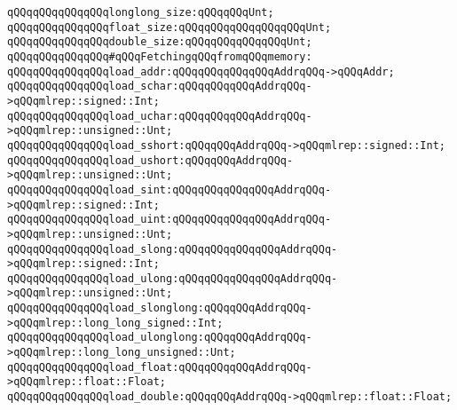 \verb|qQQqqQQqqQQqqQQqlonglong_size:qQQqqQQqUnt;|\newline
\verb|qQQqqQQqqQQqqQQqfloat_size:qQQqqQQqqQQqqQQqqQQqUnt;|\newline
\verb|qQQqqQQqqQQqqQQqdouble_size:qQQqqQQqqQQqqQQqUnt;|\newline
\newline
\newline
\newline
\verb|qQQqqQQqqQQqqQQq#qQQqFetchingqQQqfromqQQqmemory:|\newline
\newline
\verb|qQQqqQQqqQQqqQQqload_addr:qQQqqQQqqQQqqQQqAddrqQQq->qQQqAddr;|\newline
\newline
\verb|qQQqqQQqqQQqqQQqload_schar:qQQqqQQqqQQqAddrqQQq->qQQqmlrep::signed::Int;|\newline
\verb|qQQqqQQqqQQqqQQqload_uchar:qQQqqQQqqQQqAddrqQQq->qQQqmlrep::unsigned::Unt;|\newline
\newline
\verb|qQQqqQQqqQQqqQQqload_sshort:qQQqqQQqAddrqQQq->qQQqmlrep::signed::Int;|\newline
\verb|qQQqqQQqqQQqqQQqload_ushort:qQQqqQQqAddrqQQq->qQQqmlrep::unsigned::Unt;|\newline
\newline
\verb|qQQqqQQqqQQqqQQqload_sint:qQQqqQQqqQQqqQQqAddrqQQq->qQQqmlrep::signed::Int;|\newline
\verb|qQQqqQQqqQQqqQQqload_uint:qQQqqQQqqQQqqQQqAddrqQQq->qQQqmlrep::unsigned::Unt;|\newline
\newline
\verb|qQQqqQQqqQQqqQQqload_slong:qQQqqQQqqQQqqQQqAddrqQQq->qQQqmlrep::signed::Int;|\newline
\verb|qQQqqQQqqQQqqQQqload_ulong:qQQqqQQqqQQqqQQqAddrqQQq->qQQqmlrep::unsigned::Unt;|\newline
\newline
\verb|qQQqqQQqqQQqqQQqload_slonglong:qQQqqQQqAddrqQQq->qQQqmlrep::long_long_signed::Int;|\newline
\verb|qQQqqQQqqQQqqQQqload_ulonglong:qQQqqQQqAddrqQQq->qQQqmlrep::long_long_unsigned::Unt;|\newline
\newline
\verb|qQQqqQQqqQQqqQQqload_float:qQQqqQQqqQQqAddrqQQq->qQQqmlrep::float::Float;|\newline
\verb|qQQqqQQqqQQqqQQqload_double:qQQqqQQqAddrqQQq->qQQqmlrep::float::Float;|\newline
\newline
